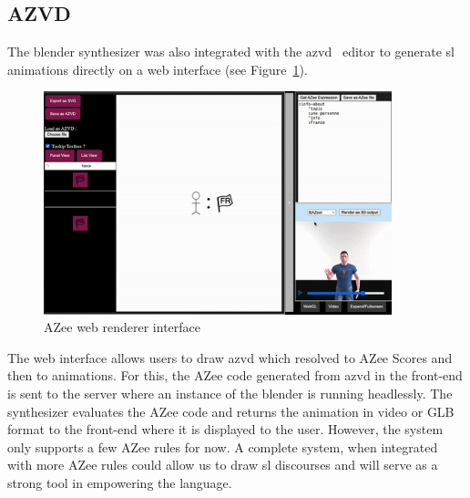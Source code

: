 \documentclass[../../main.tex]{subfiles}
\begin{document}
\subsection{AZVD}
\label{ch:conclusion:future:realistic_avatars}

The blender synthesizer was also integrated with the \gls{azvd}~\cite{filhol2024software} editor to generate \gls{sl} animations directly on a web interface (see Figure~\ref{fig:conclusion:azee_web_interface}).

\begin{figure}[ht]
    \centering
    \includegraphics[width=0.9\textwidth]{chapters/conclusion/images/azee_web_interface.png}
    \caption{AZee web renderer interface}
    \label{fig:conclusion:azee_web_interface}
\end{figure}

The web interface allows users to draw \gls{azvd} which resolved to AZee Scores and then to animations. For this, the AZee code generated from \gls{azvd} in the front-end is sent to the server where an instance of the blender is running headlessly. The synthesizer evaluates the AZee code and returns the animation in video or GLB format to the front-end where it is displayed to the user. However, the system only supports a few AZee rules for now. A complete system, when integrated with more AZee rules could allow us to draw \gls{sl} discourses and will serve as a strong tool in empowering the language.
\end{document}
